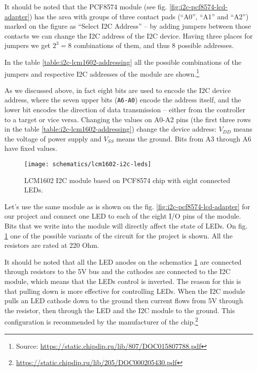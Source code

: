 \documentclass[../sparc.tex]{subfiles}
\begin{document}
It should be noted that the PCF8574 module (see
fig. \ref{fig:i2c-pcf8574-lcd-adapter}) has the area with groups of three
contact pads (``A0'', ``A1'' and ``A2'') marked on the figure as ``Select I2C
Address'' -- by adding jumpers between those contacts we can change the I2C
address of the I2C device.  Having three places for jumpers we get $2^3 = 8$
combinations of them, and thus 8 possible addresses.


In the table \ref{table:i2c-lcm1602-addressing} all the possible combinations of
the jumpers and respective I2C addresses of the module are
shown.\footnote{Source:
\url{https://static.chipdip.ru/lib/807/DOC015807788.pdf}}

As we discussed above, in fact eight bits are used to encode the I2C device
address, where the seven upper bits (\texttt{A6-A0}) encode the address itself,
and the lower bit encodes the direction of data transmission -- either from the
controller to a target or vice versa.  Changing the values on A0-A2 pins (the
first three rows in the table \ref{table:i2c-lcm1602-addressing}) change the
device address: $V_{DD}$ means the voltage of power supply and $V_{SS}$ means
the ground.  Bits from A3 through A6 have fixed values.

\begin{figure}[H]
  \centering
  \texttt{[image: schematics/lcm1602-i2c-leds]}
  \caption{LCM1602 I2C module based on PCF8574 chip with eight connected LEDs.}
  \label{fig:lcm1602-i2c-leds}
\end{figure}

Let's use the same module as is shown on the fig.
\ref{fig:i2c-pcf8574-lcd-adapter} for our project and connect one LED to each of
the eight I/O pins of the module.  Bits that we write into the module will
directly affect the state of LEDs.  On fig. \ref{fig:lcm1602-i2c-leds} one of
the possible variants of the circuit for the project is shown.  All the
resistors are rated at 220 Ohm.

It should be noted that all the LED anodes on the schematics
\ref{fig:lcm1602-i2c-leds} are connected through resistors to the 5V bus and the
cathodes are connected to the I2C module, which means that the LEDs control is
inverted.  The reason for this is that pulling down is more effective for
controlling LEDs.  When the I2C module pulls an LED cathode down to the ground
then current flows from 5V through the resistor, then through the LED and the
I2C module to the ground.  This configuration is recommended by the manufacturer
of the chip.\footnote{\url{https://static.chipdip.ru/lib/205/DOC000205430.pdf}}
\end{document}
